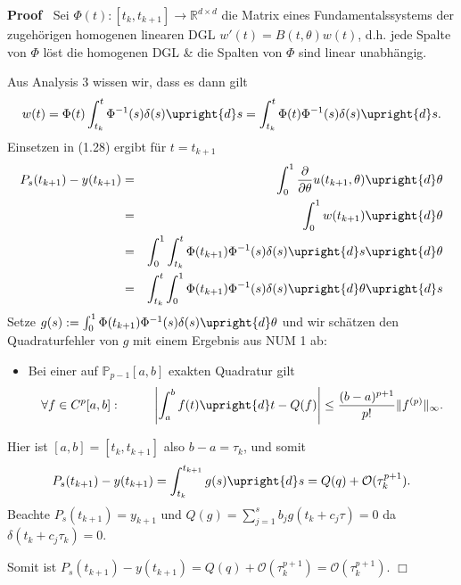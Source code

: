 \documentclass{book}
\newcommand{\assign}{:=}
\newenvironment{itemizedot}{\begin{itemize} \renewcommand{\labelitemi}{$\bullet$}\renewcommand{\labelitemii}{$\bullet$}\renewcommand{\labelitemiii}{$\bullet$}\renewcommand{\labelitemiv}{$\bullet$}}{\end{itemize}}
\newenvironment{proof}{\noindent\textbf{Proof\ }}{\hspace*{\fill}$\Box$\medskip}
\begin{document}
\begin{proof}
  Sei $\Phi (t) : [t_k, t_{k + 1}] \rightarrow \mathbb{R}^{d \times d}$ die
  Matrix eines Fundamentalssystems der zugeh{\"o}rigen homogenen linearen DGL
  $w' (t) = B (t, \theta) w (t)$, d.h. jede Spalte von $\Phi$ l{\"o}st die
  homogenen DGL \& die Spalten von $\Phi$ sind linear unabh{\"a}ngig.
  
  Aus Analysis 3 wissen wir, dass es dann gilt
  \[ w (t) = \Phi (t) \int_{t_k}^t \Phi^{- 1} (s) \delta (s)  \upright{d} s =
     \int_{t_k}^t \Phi (t) \Phi^{- 1} (s) \delta (s)  \upright{d} s. \]
  {\hspace{1.7em}}Einsetzen in (1.28) ergibt f{\"u}r $t = t_{k + 1}$
  \begin{eqnarray*}
    P_s (t_{k + 1}) - y (t_{k + 1}) & = & \int_0^1 \frac{\partial}{\partial
    \theta} u (t_{k + 1}, \theta) \upright{d} \theta\\
    & = & \int_0^1 w (t_{k + 1}) \upright{d} \theta\\
    & = & \int_0^1 \int_{t_k}^t \Phi (t_{k + 1}) \Phi^{- 1} (s) \delta (s) 
    \upright{d} s \upright{d} \theta\\
    & = & \int_{t_k}^t \int_0^1 \Phi (t_{k + 1}) \Phi^{- 1} (s) \delta (s) 
    \upright{d} \theta \upright{d} s
  \end{eqnarray*}
  {\hspace{1.7em}}Setze $g (s) \assign \int_0^1 \Phi (t_{k + 1}) \Phi^{- 1}
  (s) \delta (s) \upright{d} \theta$ und wir sch{\"a}tzen den Quadraturfehler
  von $g$ mit einem Ergebnis aus NUM 1 ab:
  \begin{itemizedot}
    \item Bei einer auf $\mathbb{P}_{p - 1} [a, b]$ exakten Quadratur gilt
    \[ \forall f \in C^p [a, b] :  \text{{\hspace{1,5em}}} \quad \left|
       \int_a^b f (t) \upright{d} t - Q (f) \right| \leq \frac{(b - a)^{p +
       1}}{p!} \| f^{(p)} \|_{\infty} . \]
  \end{itemizedot}
  {\hspace{1.7em}}Hier ist $[a, b] = [t_k, t_{k + 1}]$ also $b - a = \tau_k$,
  und somit
  \[ P_s (t_{k + 1}) - y (t_{k + 1}) = \int_{t_k}^{t_{k + 1}} g (s)
     \upright{d} s = Q (q) +\mathcal{O} (\tau_k^{p + 1}) . \]
  {\hspace{1.7em}}Beachte $P_s (t_{k + 1}) = y_{k + 1}$ und $Q (g) = \sum_{j =
  1}^s b_j g (t_k + c_j \tau) = 0$ da $\delta (t_k + c_j \tau_k) = 0$.
  
  Somit ist $P_s (t_{k + 1}) - y (t_{k + 1}) = Q (q) +\mathcal{O} (\tau_k^{p +
  1}) =\mathcal{O} (\tau_k^{p + 1})$.
\end{proof}
\end{document}
